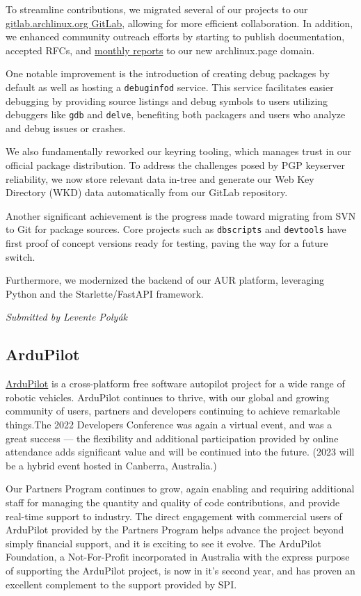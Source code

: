 \documentclass[a4paper]{report}
\begin{document}
To streamline contributions, we migrated several of our projects to our \href{https://gitlab.archlinux.org}{gitlab.archlinux.org GitLab}, allowing for more efficient collaboration. In addition, we enhanced community outreach efforts by starting to publish documentation, accepted RFCs, and \href{https://monthly-reports.archlinux.page/}{monthly reports} to our new archlinux.page domain.

One notable improvement is the introduction of creating debug packages by default as well as hosting a {\tt debuginfod} service. This service facilitates easier debugging by providing source listings and debug symbols to users utilizing debuggers like {\tt gdb} and {\tt delve}, benefiting both packagers and users who analyze and debug issues or crashes.

We also fundamentally reworked our keyring tooling, which manages trust in our official package distribution. To address the challenges posed by PGP keyserver reliability, we now store relevant data in-tree and generate our Web Key Directory
(WKD) data automatically from our GitLab repository.

Another significant achievement is the progress made toward migrating from SVN to Git for package sources. Core projects such as {\tt dbscripts} and {\tt devtools} have first proof of concept versions ready for testing, paving the way for a future switch.

Furthermore, we modernized the backend of our AUR platform, leveraging Python and the Starlette/FastAPI framework.

{\em Submitted by Levente Polyák}

\subsection{ArduPilot}

\href{https://ardupilot.org/}{ArduPilot} is a cross-platform free software autopilot project for a wide range of robotic vehicles. ArduPilot continues to thrive, with our global and growing community of users, partners and developers continuing to achieve remarkable things.The 2022 Developers Conference was again a virtual event, and was a great success --- the flexibility and additional participation provided by online attendance adds significant value and will be continued into the future. (2023 will be a hybrid event hosted in Canberra, Australia.)

Our Partners Program continues to grow, again enabling and requiring additional staff for managing the quantity and quality of code contributions, and provide real-time support to industry. The direct engagement with commercial users of ArduPilot provided by the Partners Program helps advance the project beyond simply financial support, and it is exciting to see it evolve.  The ArduPilot Foundation, a Not-For-Profit incorporated in Australia with the express purpose of supporting the ArduPilot project, is now in it's second year, and has proven an excellent complement to the support provided by SPI.
\end{document}
